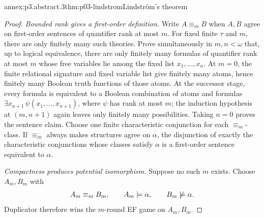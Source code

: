 \begin{annexitem}{annex:p3.abstract.3}{thm:p03-lindstrom}{Lindstr\"om's theorem}
\begin{proof}
\emph{Bounded rank gives a first-order definition.}
Write \(A\equiv_mB\) when \(A,B\) agree on first-order sentences of
quantifier rank at most \(m\).  For fixed finite \(\tau\) and \(m\), there
are only finitely many such theories.  Prove simultaneously in \(m,n<\omega\)
that, up to logical equivalence, there are only finitely many formulas of
quantifier rank at most \(m\) whose free variables lie among the fixed list
\(x_1,\ldots,x_n\).  At \(m=0\), the finite relational signature and fixed
variable list give finitely many atoms, hence finitely many Boolean truth
functions of those atoms.  At the successor stage, every formula is equivalent
to a Boolean combination of atoms and formulas
\(\exists x_{n+1}\,\psi(x_1,\ldots,x_{n+1})\), where \(\psi\) has rank at
most \(m\); the induction hypothesis at \((m,n+1)\) again leaves only
finitely many possibilities.  Taking \(n=0\) proves the sentence claim.
Choose one finite characteristic conjunction for each
\(\equiv_m\)-class.  If \(\equiv_m\) always makes structures agree on
\(\alpha\), the disjunction of exactly the characteristic conjunctions whose
classes satisfy \(\alpha\) is a first-order sentence equivalent to
\(\alpha\).

\emph{Compactness produces potential isomorphism.}
Suppose no such \(m\) exists.  Choose \(A_m,B_m\) with
\[
 A_m\equiv_mB_m,\qquad A_m\models\alpha,\qquad B_m\not\models\alpha.
\]
Duplicator therefore wins the \(m\)-round EF game on \(A_m,B_m\).


\end{proof}
\end{annexitem}
